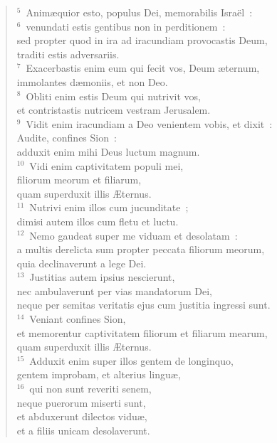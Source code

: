 \begin{flushleft}\begin{verse}${}^{5}$~Anim\ae quior esto, populus Dei, memorabilis Isra\"el~:\\
${}^{6}$~venundati estis gentibus non in perditionem~:\\ sed propter quod in ira ad iracundiam provocastis Deum,\\ traditi estis adversariis.\\
${}^{7}$~Exacerbastis enim eum qui fecit vos, Deum \ae ternum,\\ immolantes d\ae moniis, et non Deo.\\
${}^{8}$~Obliti enim estis Deum qui nutrivit vos,\\ et contristastis nutricem vestram Jerusalem.\\
${}^{9}$~Vidit enim iracundiam a Deo venientem vobis, et dixit~:\\ Audite, confines Sion~:\\ adduxit enim mihi Deus luctum magnum.\\
${}^{10}$~Vidi enim captivitatem populi mei,\\ filiorum meorum et filiarum,\\ quam superduxit illis \AE ternus.\\
${}^{11}$~Nutrivi enim illos cum jucunditate~;\\ dimisi autem illos cum fletu et luctu.\\
${}^{12}$~Nemo gaudeat super me viduam et desolatam~:\\ a multis derelicta sum propter peccata filiorum meorum,\\ quia declinaverunt a lege Dei.\\
${}^{13}$~Justitias autem ipsius nescierunt,\\ nec ambulaverunt per vias mandatorum Dei,\\ neque per semitas veritatis ejus cum justitia ingressi sunt.\\
${}^{14}$~Veniant confines Sion,\\ et memorentur captivitatem filiorum et filiarum mearum,\\ quam superduxit illis \AE ternus.\\
${}^{15}$~Adduxit enim super illos gentem de longinquo,\\ gentem improbam, et alterius lingu\ae ,\\
${}^{16}$~qui non sunt reveriti senem,\\ neque puerorum miserti sunt,\\ et abduxerunt dilectos vidu\ae ,\\ et a filiis unicam desolaverunt.\\

\end{verse}
\end{flushleft}
